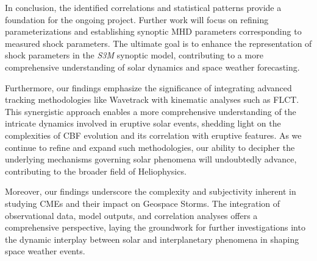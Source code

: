 In conclusion, the identified correlations and statistical patterns provide a foundation for the ongoing project. Further work will focus on refining parameterizations and establishing synoptic MHD parameters corresponding to measured shock parameters. The ultimate goal is to enhance the representation of shock parameters in the \textit{S3M} synoptic model, contributing to a more comprehensive understanding of solar dynamics and space weather forecasting.

Furthermore, our findings emphasize the significance of integrating advanced tracking methodologies like Wavetrack with kinematic analyses such as FLCT. This synergistic approach enables a more comprehensive understanding of the intricate dynamics involved in eruptive solar events, shedding light on the complexities of CBF evolution and its correlation with eruptive features. As we continue to refine and expand such methodologies, our ability to decipher the underlying mechanisms governing solar phenomena will undoubtedly advance, contributing to the broader field of Heliophysics.

Moreover, our findings underscore the complexity and subjectivity inherent in studying CMEs and their impact on Geospace Storms. The integration of observational data, model outputs, and correlation analyses offers a comprehensive perspective, laying the groundwork for further investigations into the dynamic interplay between solar and interplanetary phenomena in shaping space weather events.
